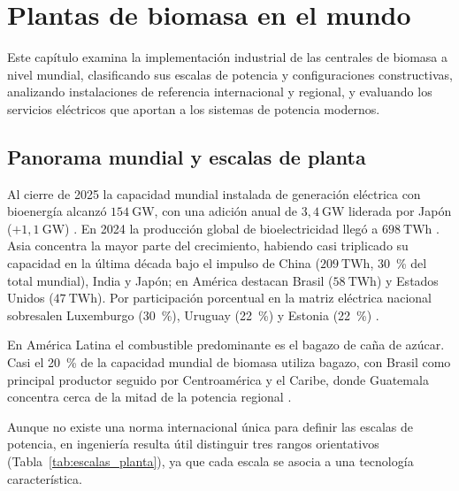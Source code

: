 \chapter{Plantas de biomasa en el mundo}
\label{cap:plantas_mundo}

Este capítulo examina la implementación industrial de las centrales de biomasa a nivel mundial, clasificando sus escalas de potencia y configuraciones constructivas, analizando instalaciones de referencia internacional y regional, y evaluando los servicios eléctricos que aportan a los sistemas de potencia modernos.

\section{Panorama mundial y escalas de planta}
\label{sec:panorama_escalas}

Al cierre de 2025 la capacidad mundial instalada de generación eléctrica con bioenergía alcanzó $154~\text{GW}$, con una adición anual de $3{,}4~\text{GW}$ liderada por Japón ($+1{,}1~\text{GW}$) \cite{irena2026capacity}. En 2024 la producción global de bioelectricidad llegó a $698~\text{TWh}$ \cite{wba2025gbsr}. Asia concentra la mayor parte del crecimiento, habiendo casi triplicado su capacidad en la última década bajo el impulso de China ($209~\text{TWh}$, 30~\% del total mundial), India y Japón; en América destacan Brasil ($58~\text{TWh}$) y Estados Unidos ($47~\text{TWh}$). Por participación porcentual en la matriz eléctrica nacional sobresalen Luxemburgo (30~\%), Uruguay (22~\%) y Estonia (22~\%) \cite{wba2025gbsr}.

En América Latina el combustible predominante es el bagazo de caña de azúcar. Casi el 20~\% de la capacidad mundial de biomasa utiliza bagazo, con Brasil como principal productor seguido por Centroamérica y el Caribe, donde Guatemala concentra cerca de la mitad de la potencia regional \cite{er2019centroamerica, torijano2025cepal}.

Aunque no existe una norma internacional única para definir las escalas de potencia, en ingeniería resulta útil distinguir tres rangos orientativos (Tabla~\ref{tab:escalas_planta}), ya que cada escala se asocia a una tecnología característica.

